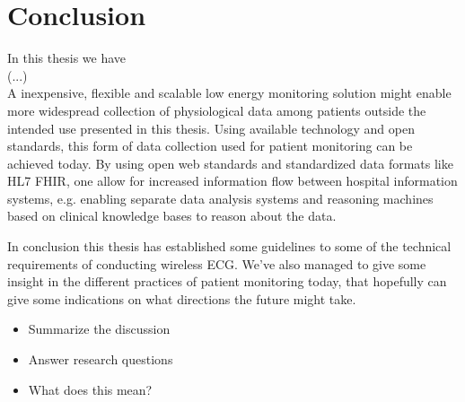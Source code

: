 \section{Conclusion} %
\label{sec:conclusion}

In this thesis we have 
\\
\newline
(...)
\\
\newline
A inexpensive, flexible and scalable low energy monitoring solution might enable more widespread collection of physiological data among patients outside the intended use presented in this thesis. Using available technology and open standards, this form of data collection used for patient monitoring can be achieved today. By using open web standards and standardized data formats like HL7 FHIR, one allow for increased information flow between hospital information systems, e.g. enabling separate data analysis systems and reasoning machines based on clinical knowledge bases to reason about the data.

In conclusion this thesis has established some guidelines to some of the technical requirements of conducting wireless ECG. We've also managed to give some insight in the different practices of patient monitoring today, that hopefully can give some indications on what directions the future might take.

\begin{itemize}
  \item Summarize the discussion
  \item Answer research questions
  \item What does this mean?
\end{itemize}




